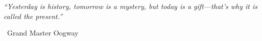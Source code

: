 \begin{center}
\fontsize{16}{20}\selectfont %
\itshape %
“Yesterday is history, tomorrow is a mystery, but today is a gift—that’s why it is called the present.”
\end{center}

\vspace{1em} %

\begin{flushright}
\fontsize{12}{14}\selectfont %
\textemdash\ Grand Master Oogway
\end{flushright}

\vfill
\null
\clearpage
